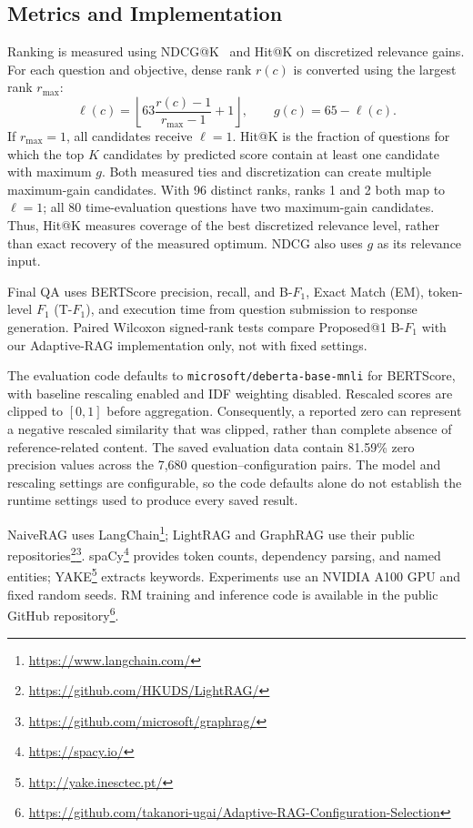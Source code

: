 \subsection{Metrics and Implementation} \label{sec4.6}\label{sec4.7}
Ranking is measured using NDCG@K~\cite{JarvelinKalervo02} and Hit@K on discretized relevance gains. For each question and objective, dense rank $r(c)$ is converted using the largest rank $r_{\max}$:
\begin{equation}
\ell(c)=\left\lfloor 63\frac{r(c)-1}{r_{\max}-1}+1\right\rfloor,
\qquad g(c)=65-\ell(c).
\label{eq:relevance}
\end{equation}
If $r_{\max}=1$, all candidates receive $\ell=1$. Hit@K is the fraction of questions for which the top $K$ candidates by predicted score contain at least one candidate with maximum $g$. Both measured ties and discretization can create multiple maximum-gain candidates. With 96 distinct ranks, ranks 1 and 2 both map to $\ell=1$; all 80 time-evaluation questions have two maximum-gain candidates. Thus, Hit@K measures coverage of the best discretized relevance level, rather than exact recovery of the measured optimum. NDCG also uses $g$ as its relevance input.

 Final QA uses BERTScore precision, recall, and B-$F_1$, Exact Match (EM), token-level $F_1$ (T-$F_1$), and execution time from question submission to response generation. Paired Wilcoxon signed-rank tests compare Proposed@1 B-$F_1$ with our Adaptive-RAG implementation only, not with fixed settings.

The evaluation code defaults to \texttt{microsoft/deberta-base-mnli} for BERTScore, with baseline rescaling enabled and IDF weighting disabled. Rescaled scores are clipped to $[0,1]$ before aggregation. Consequently, a reported zero can represent a negative rescaled similarity that was clipped, rather than complete absence of reference-related content. The saved evaluation data contain 81.59\% zero precision values across the 7,680 question--configuration pairs. The model and rescaling settings are configurable, so the code defaults alone do not establish the runtime settings used to produce every saved result.

NaiveRAG uses LangChain\footnote{\url{https://www.langchain.com/}}; LightRAG and GraphRAG use their public repositories\footnote{\url{https://github.com/HKUDS/LightRAG/}}\footnote{\url{https://github.com/microsoft/graphrag/}}. spaCy\footnote{\url{https://spacy.io/}} provides token counts, dependency parsing, and named entities; YAKE\footnote{\url{http://yake.inesctec.pt/}} extracts keywords. Experiments use an NVIDIA A100 GPU and fixed random seeds. RM training and inference code is available in the public GitHub repository\footnote{\url{https://github.com/takanori-ugai/Adaptive-RAG-Configuration-Selection}}.
